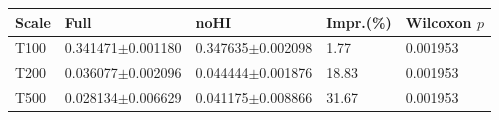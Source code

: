 \begin{tabular}{lllll}
\hline
Scale & Full & noHI & Impr.(\%) & Wilcoxon $p$ \\
\hline
T100 & 0.341471$\pm$0.001180 & 0.347635$\pm$0.002098 & 1.77 & 0.001953 \\
T200 & 0.036077$\pm$0.002096 & 0.044444$\pm$0.001876 & 18.83 & 0.001953 \\
T500 & 0.028134$\pm$0.006629 & 0.041175$\pm$0.008866 & 31.67 & 0.001953 \\
\hline
\end{tabular}